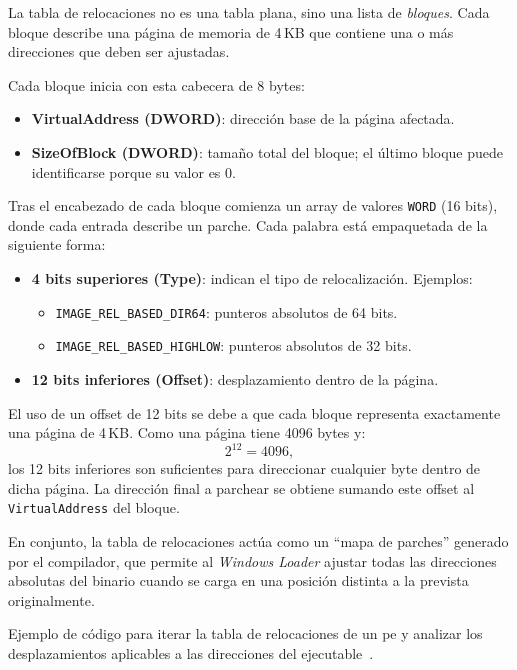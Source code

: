 La tabla de relocaciones no es una tabla plana, sino una lista de \textit{bloques}.  
Cada bloque describe una página de memoria de 4\,KB que contiene una o más direcciones que deben ser ajustadas. 

Cada bloque inicia con esta cabecera de 8 bytes:

\begin{itemize}
    \item \textbf{VirtualAddress (DWORD)}: dirección base de la página afectada.
    \item \textbf{SizeOfBlock (DWORD)}: tamaño total del bloque; el último bloque puede identificarse porque su valor es 0.
\end{itemize}

Tras el encabezado de cada bloque comienza un array de valores \texttt{WORD} (16 bits), donde cada entrada describe un parche. Cada palabra está empaquetada de la siguiente forma:

\begin{itemize}
    \item \textbf{4 bits superiores (Type)}: indican el tipo de relocalización. Ejemplos:
        \begin{itemize}
            \item \texttt{IMAGE\_REL\_BASED\_DIR64}: punteros absolutos de 64 bits.
            \item \texttt{IMAGE\_REL\_BASED\_HIGHLOW}: punteros absolutos de 32 bits.
        \end{itemize}
    \item \textbf{12 bits inferiores (Offset)}: desplazamiento dentro de la página.
\end{itemize}

El uso de un offset de 12 bits se debe a que cada bloque representa exactamente una página de 4\,KB.  
Como una página tiene 4096 bytes y:
\[
2^{12} = 4096,
\]
los 12 bits inferiores son suficientes para direccionar cualquier byte dentro de dicha página.  
La dirección final a parchear se obtiene sumando este offset al \texttt{VirtualAddress} del bloque.

En conjunto, la tabla de relocaciones actúa como un “mapa de parches” generado por el compilador, que permite al \textit{Windows Loader} ajustar todas las direcciones absolutas del binario cuando se carga en una posición distinta a la prevista originalmente.

Ejemplo de código para iterar la tabla de relocaciones de un \acrshort{pe} y analizar los desplazamientos aplicables a las direcciones del ejecutable~\cite{walking_PE_relocs}.

